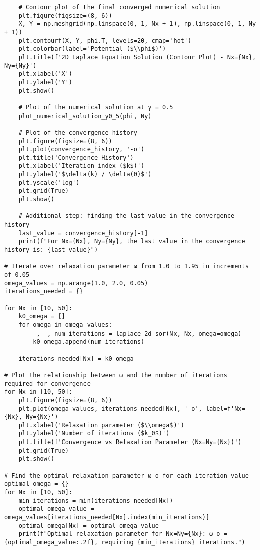\documentclass[a4paper, twoside]{article}
\begin{document}
\begin{lstlisting}
    # Contour plot of the final converged numerical solution
    plt.figure(figsize=(8, 6))
    X, Y = np.meshgrid(np.linspace(0, 1, Nx + 1), np.linspace(0, 1, Ny + 1))
    plt.contourf(X, Y, phi.T, levels=20, cmap='hot')
    plt.colorbar(label='Potential ($\\phi$)')
    plt.title(f'2D Laplace Equation Solution (Contour Plot) - Nx={Nx}, Ny={Ny}')
    plt.xlabel('X')
    plt.ylabel('Y')
    plt.show()

    # Plot of the numerical solution at y = 0.5
    plot_numerical_solution_y0_5(phi, Ny)

    # Plot of the convergence history
    plt.figure(figsize=(8, 6))
    plt.plot(convergence_history, '-o')
    plt.title('Convergence History')
    plt.xlabel('Iteration index ($k$)')
    plt.ylabel('$\delta(k) / \delta(0)$')
    plt.yscale('log')
    plt.grid(True)
    plt.show()

    # Additional step: finding the last value in the convergence history
    last_value = convergence_history[-1]
    print(f"For Nx={Nx}, Ny={Ny}, the last value in the convergence history is: {last_value}")

# Iterate over relaxation parameter ω from 1.0 to 1.95 in increments of 0.05
omega_values = np.arange(1.0, 2.0, 0.05)
iterations_needed = {}

for Nx in [10, 50]:
    k0_omega = []
    for omega in omega_values:
        _, _, num_iterations = laplace_2d_sor(Nx, Nx, omega=omega)
        k0_omega.append(num_iterations)
    
    iterations_needed[Nx] = k0_omega

# Plot the relationship between ω and the number of iterations required for convergence
for Nx in [10, 50]:
    plt.figure(figsize=(8, 6))
    plt.plot(omega_values, iterations_needed[Nx], '-o', label=f'Nx={Nx}, Ny={Nx}')
    plt.xlabel('Relaxation parameter ($\\omega$)')
    plt.ylabel('Number of iterations ($k_0$)')
    plt.title(f'Convergence vs Relaxation Parameter (Nx=Ny={Nx})')
    plt.grid(True)
    plt.show()

# Find the optimal relaxation parameter ω_o for each iteration value
optimal_omega = {}
for Nx in [10, 50]:
    min_iterations = min(iterations_needed[Nx])
    optimal_omega_value = omega_values[iterations_needed[Nx].index(min_iterations)]
    optimal_omega[Nx] = optimal_omega_value
    print(f"Optimal relaxation parameter for Nx=Ny={Nx}: ω_o = {optimal_omega_value:.2f}, requiring {min_iterations} iterations.")


\end{lstlisting}
\end{document}
